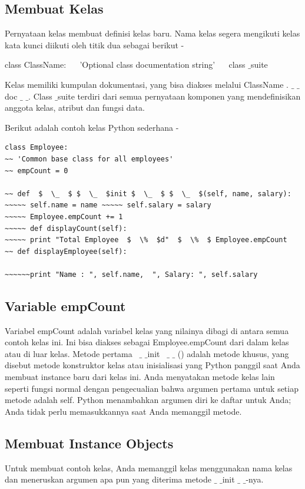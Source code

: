 \subsection {Membuat Kelas}

Pernyataan kelas membuat definisi kelas baru. Nama kelas segera mengikuti kelas kata kunci diikuti oleh titik dua sebagai berikut -

class ClassName:
~~ 'Optional class documentation string'
~~ class $  \_  $suite

Kelas memiliki kumpulan dokumentasi, yang bisa diakses melalui ClassName . $  \_  $ $  \_  $ doc $  \_  $ $  \_  $.  Class $  \_  $suite terdiri dari semua pernyataan komponen yang mendefinisikan anggota kelas, atribut dan fungsi data.


Berikut adalah contoh kelas Python sederhana -
\begin{verbatim}
class Employee:
~~ 'Common base class for all employees'
~~ empCount = 0

~~ def  $  \_  $ $  \_  $init $  \_  $ $  \_  $(self, name, salary):
~~~~~ self.name = name ~~~~~ self.salary = salary
~~~~~ Employee.empCount += 1
~~~~~ def displayCount(self):
~~~~~ print "Total Employee  $  \%  $d"  $  \%  $ Employee.empCount
~~ def displayEmployee(self):

~~~~~~print "Name : ", self.name,  ", Salary: ", self.salary
\end{verbatim}

\subsection{Variable empCount}
Variabel empCount adalah variabel kelas yang nilainya dibagi di antara semua contoh kelas ini. Ini bisa diakses sebagai Employee.empCount dari dalam kelas atau di luar kelas. Metode pertama  $  \_  $ $  \_  $init  $  \_  $ $  \_ $ () adalah metode khusus, yang disebut metode konstruktor kelas atau inisialisasi yang Python panggil saat Anda membuat instance baru dari kelas ini. Anda menyatakan metode kelas lain seperti fungsi normal dengan pengecualian bahwa argumen pertama untuk setiap metode adalah self. Python menambahkan argumen diri ke daftar untuk Anda; Anda tidak perlu memasukkannya saat Anda memanggil metode.


\subsection{Membuat Instance Objects}
Untuk membuat contoh kelas, Anda memanggil kelas menggunakan nama kelas dan meneruskan argumen apa pun yang diterima metode  $  \_  $ $  \_  $init $  \_  $ $  \_  $-nya.

